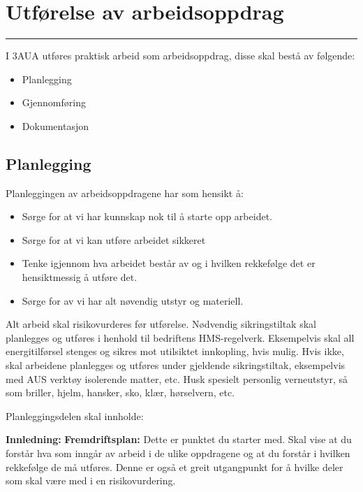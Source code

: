 
\section {Utførelse av arbeidsoppdrag}
\hrule

\vskip 1cm

I 3AUA utføres praktisk arbeid som arbeidsoppdrag, disse skal bestå av følgende:\begin{itemize}[noitemsep]
	\item Planlegging
	\item Gjennomføring
	\item Dokumentasjon
\end{itemize}

\subsection {Planlegging}

Planleggingen av arbeidsoppdragene har som hensikt å:

\begin{itemize}[noitemsep]
	\item Sørge for at vi har kunnskap nok til å starte opp arbeidet. 
	\item Sørge for at vi kan utføre arbeidet sikkeret
	\item Tenke igjennom hva arbeidet består av og i hvilken rekkefølge det er hensiktmessig å utføre det. 
	\item Sørge for av vi har alt nøvendig utstyr og materiell. 
\end{itemize}



Alt arbeid skal risikovurderes før utførelse. Nødvendig sikringstiltak skal planlegges og utføres i henhold til bedriftens HMS-regelverk. Eksempelvis skal all energitilførsel stenges og sikres mot utilsiktet innkopling, hvis mulig. Hvis ikke, skal arbeidene planlegges og utføres under gjeldende sikringstiltak, eksempelvis med AUS verktøy isolerende matter, etc. Husk spesielt personlig verneutstyr, så som briller, hjelm, hansker, sko, klær, hørselvern, etc.

Planleggingsdelen skal innholde:

\textbf{Innledning:}
\vskip 10pt 
\vskip 10pt 
\textbf{Fremdriftsplan:}
\vskip 10pt 
Dette er punktet du starter med. Skal vise at du forstår hva som inngår av arbeid i de ulike oppdragene og at du forstår i hvilken rekkefølge de må utføres. Denne er også et greit utgangpunkt for å hvilke deler som skal være med i en risikovurdering. 

